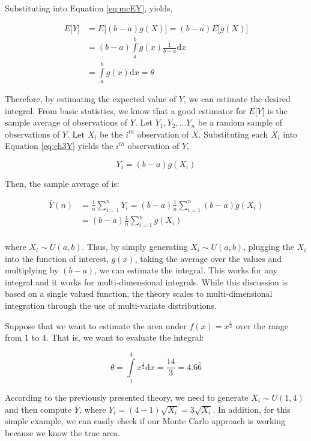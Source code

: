 \documentclass[
]{book}
\theoremstyle{definition}
\theoremstyle{definition}
\theoremstyle{definition}
\theoremstyle{definition}
\theoremstyle{remark}
\begin{document}
Substituting into Equation \eqref{eq:mcEY}, yields,

\[\begin{aligned}
E\lbrack Y \rbrack & = E\lbrack \left(b-a\right)g(X) \rbrack = \left(b-a\right)E\lbrack g(X) \rbrack\\
      & =  \left(b-a\right)\int\limits_{a}^{b} g(x)\frac{1}{b-a}\mathrm{d}x \\
      & = \int\limits_{a}^{b} g(x)\mathrm{d}x = \theta\end{aligned}\]

Therefore, by estimating the expected value of \(Y\), we can estimate the
desired integral. From basic statistics, we know that a good estimator
for \(E\lbrack Y \rbrack\) is the sample average of observations of \(Y\). Let \(Y_{1}, Y_{2},...Y_{n}\) be a
random sample of observations of \(Y\). Let \(X_{i}\) be the \(i^{th}\)
observation of \(X\). Substituting each \(X_{i}\) into
Equation \eqref{eq:ch3Y} yields the \(i^{th}\) observation of \(Y\),

\[Y_{i} = \left(b-a\right)g(X_{i})\]

Then, the sample average of is:

\[\begin{aligned}
\bar{Y}(n) & = \frac{1}{n}\sum\limits_{i=1}^{n} Y_{i} = \left(b-a\right)\frac{1}{n}\sum\limits_{i=1}^{n}\left(b-a\right)g(X_{i})\\
  & = \left(b-a\right)\frac{1}{n}\sum\limits_{i=1}^{n}g(X_{i})\\\end{aligned}\]

where \(X_{i} \sim U(a,b)\). Thus, by simply generating
\(X_{i} \sim U(a,b)\), plugging the \(X_{i}\) into the function of interest,
\(g(x)\), taking the average over the values and multiplying by
\(\left(b-a\right)\), we can estimate the integral. This works for any
integral and it works for multi-dimensional integrals. While this
discussion is based on a single valued function, the theory scales to
multi-dimensional integration through the use of multi-variate
distributions.

Suppose that we want to estimate
the area under \(f(x) = x^{\frac{1}{2}}\) over the range from \(1\) to \(4\). That is, we want to evaluate the integral:

\[\theta = \int\limits_{1}^{4} x^{\frac{1}{2}}\mathrm{d}x = \dfrac{14}{3}=4.6\bar{6}\]

According to the previously presented theory, we need to generate
\(X_i \sim U(1,4)\) and then compute \(\bar{Y}\), where
\(Y_i = (4-1)\sqrt{X{_i}}= 3\sqrt{X{_i}}\). In addition, for this simple example,
we can easily check if our Monte Carlo approach is working because we
know the true area.
\end{document}
